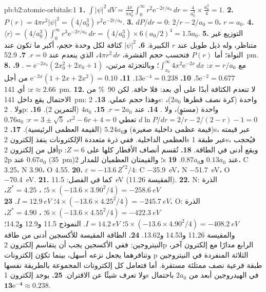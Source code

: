 \begin{solution}{pb:b2:atomic-orbitals:1}
\textbf{1.} $\int|\psi|^2\,dV = \frac{4\pi}{\pi a_0^3}\int_0^\infty r^2\mathrm e^{-2r/a_0}\,dr =
\frac{4}{a_0^3} \times \frac{a_0^3}{4} = 1$.
\textbf{2.} $P(r) = 4\pi r^2|\psi|^2 = (4/a_0^3)\,r^2\mathrm e^{-2r/a_0}$.
\textbf{3.} $dP/dr = 0$: $2/r - 2/a_0 = 0$، $r = a_0$.
\textbf{4.} $\langle r\rangle = (4/a_0^3)\int_0^\infty r^3\mathrm e^{-2r/a_0}\,dr = (4/a_0^3)
\times 6(a_0/2)^4 = 1.5a_0$.
\textbf{5.} التوزيع غير متناظر، وله ذيل طويل عند $r$ الكبيرة.
\textbf{6.} $|\psi|^2$ كثافة لكل وحدة حجم، أكبر ما تكون عند النواة؛ أما $P(r)$
فتحسب حجم القشرة، $4\pi r^2\,dr$، الذي ينعدم عند $r = 0$.
\textbf{7.} \qty{52.9}{pm}.
\textbf{8.} مع $x = r/a_0$: $\int_{x_0}^\infty 4x^2\mathrm e^{-2x}\,dx$؛ وبالتجزئة مرتين،
$= \mathrm e^{-2x_0}(2x_0^2 + 2x_0 + 1)$.
\textbf{9.} $5\mathrm e^{-2} = 0.677$.
\textbf{10.} $13\mathrm e^{-4} = 0.238$.
\textbf{11.} $\mathrm e^{-2x}(1 + 2x + 2x^2) = 0.10$ من أجل $x \approx 2.66$: أي \qty{141}{pm}.
\textbf{12.} لا تنعدم الكثافة أبدًا على أي بعد: فلا حافة. لكن 90~\% من
الاحتمال يقع داخل \qty{141}{pm}: وهذا حجم عملي.
\textbf{13.} 2s:  واحدة (كرة نصف قطرها $2a_0$)، ولا . 2p:  واحدة (مستوٍ)، ولا .
\textbf{14.} عند $r = 2a_0$.
\textbf{15.} $4a_0$ (التمرين 2).
\textbf{16.} $d\ln P/dr = 2/r - 2/(2 - r) - 1 = 0$ تعطي $r^2 - 6r + 4 = 0$، $r = 3 \pm \sqrt5$:
$0.76a_0$ (قيمة عظمى داخلية صغيرة) و$5.24a_0$ (القيمة العظمى الرئيسية).
\textbf{17.} 2s، عبر قيمته العظمى الداخلية. ففي ذرة متعددة الإلكترونات ينفذ إلكترون 2s
عبر طبقة 1s، فيُحجب أقل من إلكترون 2p ويقع أدنى في
الطاقة.
\textbf{18.} تُقسم أنصاف الأقطار كلها على $Z = 6$: 2p عند $0.67a_0$ (\qty{35}{pm})؛ والقيمتان العظميان للمدار 2s
عند $0.13a_0$ و$0.87a_0$.
\textbf{19.} C 3.25، N 3.90، O 4.55.
\textbf{20.} $\varepsilon = -13.6\,Z^{*2}/4$: C \qty{-35.9}{eV}، N \qty{-51.7}{eV}، O
\qty{-70.4}{eV}.
\textbf{21.} كما في الفصل: \qty{11.5}{eV} (المقيسة 11.26).
\textbf{22.} N: الذرة $5 \times (-13.6 \times 3.90^2/4) = \qty{-258.6}{eV}$؛ ، $Z^* =
4.25$، $4 \times (-13.6 \times 4.25^2/4) = \qty{-245.7}{eV}$؛ $I = \qty{12.9}{eV}$.
\textbf{23.} O: الذرة $6 \times (-13.6 \times 4.55^2/4) = \qty{-422.3}{eV}$؛ ، $Z^* =
4.90$، $5 \times (-13.6 \times 4.90^2/4) = \qty{-408.2}{eV}$؛ $I = \qty{14.2}{eV}$. النموذج
11.5 و12.9 و14.2؛ والمقيسة 11.26 و14.53 و13.62.
\textbf{24.} الطاقة المقيسة للأكسجين أدنى من طاقة النيتروجين: ففي
الأكسجين يجب أن يتقاسم إلكترون 2p الرابع مدارًا مع إلكترون آخر، 
وتنافرهما يجعل نزعه أسهل، بينما تكوّن إلكترونات p الثلاثة المنفردة في النيتروجين
طبقة فرعية نصف ممتلئة مستقرة. أما  فتعامل كل إلكترونات المجموعة
بالطريقة نفسها ولا تعرف شيئًا عن الاقتران.
\textbf{25.} يوجد إلكترون 1s في الهيدروجين أبعد من $2a_0$ باحتمال
$\boldsymbol{13\mathrm e^{-4} \approx 0.238}$.
\end{solution}
